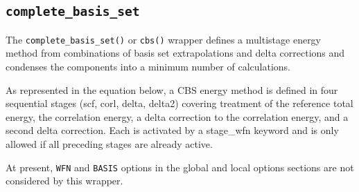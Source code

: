 \subsection{\texttt{complete\_basis\_set}\label{wrapcbs}}

The \texttt{complete\_basis\_set()} or \texttt{cbs()} wrapper defines a
multistage energy method from combinations of basis set extrapolations 
and delta corrections and condenses the components into a minimum
number of calculations.

As represented in the equation below, a CBS energy method is defined in 
four sequential stages (scf, corl, delta, delta2) covering treatment of 
the reference total energy, the correlation energy, a delta 
correction to the correlation energy, and a second delta correction. 
Each is activated by a stage\_wfn keyword and is only allowed if all 
preceding stages are already active.

At present, \texttt{WFN} and \texttt{BASIS} options in the global and 
local options sections are not considered by this wrapper.

%



